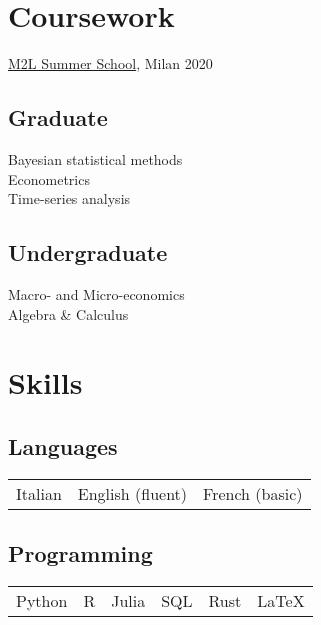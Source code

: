 \documentclass[]{deedy-resume-reversed}
\begin{document}
\begin{minipage}[t]{0.33\textwidth}
\section{Coursework}

\href{https://www.m2lschool.org/}{M2L Summer School}, Milan 2020
\vspace{\topsep}
\subsection{Graduate}
Bayesian statistical methods\\
Econometrics\\
Time-series analysis\\
\sectionsep

\subsection{Undergraduate}
Macro- and Micro-economics\\
Algebra \& Calculus\\
\sectionsep


\section{Skills}

\subsection{Languages}
\begin{tabular}{ccc}
Italian & English (fluent) & French (basic)\\
\end{tabular}
\sectionsep
\vspace{-\topsep}

\subsection{Programming}
\begin{tabular}{cccccc}
Python & R & Julia & SQL & Rust & \LaTeX
\end{tabular}
\sectionsep


\end{minipage}
\end{document}

